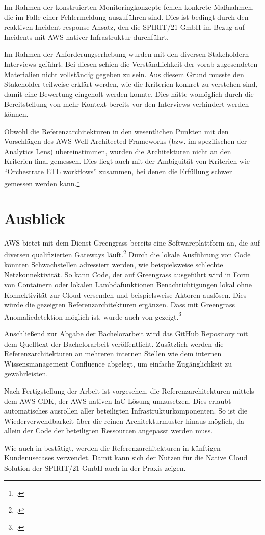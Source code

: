 Im Rahmen der konstruierten Monitoringkonzepte fehlen konkrete Maßnahmen, die im Falle einer Fehlermeldung auszuführen sind. Dies ist bedingt durch den reaktiven Incident-response Ansatz, den die SPIRIT/21 GmbH im Bezug auf Incidents mit \ac{AWS}-nativer Infrastruktur durchführt.

Im Rahmen der Anforderungserhebung wurden mit den diversen Stakeholdern Interviews geführt. Bei diesen schien die Verständlichkeit der vorab zugesendeten Materialien nicht vollständig gegeben zu sein. Aus diesem Grund musste den Stakeholder teilweise erklärt werden, wie die Kriterien konkret zu verstehen sind, damit eine Bewertung eingeholt werden konnte. Dies hätte womöglich durch die Bereitstellung von mehr Kontext bereits vor den Interviews verhindert werden können.

Obwohl die Referenzarchitekturen in den wesentlichen Punkten mit den Vorschlägen des \ac{AWS} Well-Architected Frameworks (bzw. im spezifischen der Analytics Lens) übereinstimmen, wurden die Architekturen nicht an den Kriterien final gemessen. Dies liegt auch mit der Ambiguität von Kriterien wie \enquote{Orchestrate ETL workflows} zusammen, bei denen die Erfüllung schwer gemessen werden kann.\footcite[Vgl.][6]{Ravirala.2020}


\section{Ausblick}
\ac{AWS} bietet mit dem Dienst Greengrass bereits eine Softwareplattform an, die auf diversen qualifizierten Gateways läuft.\footcite[Vgl. auch im Folgenden][]{AmazonWebServicesInc..o.J.bu} Durch die lokale Ausführung von Code könnten Schwachstellen adressiert werden, wie beispielsweise schlechte Netzkonnektivität. So kann Code, der auf Greengrass ausgeführt wird in Form von Containern oder lokalen Lambdafunktionen Benachrichtigungen lokal ohne Konnektivität zur Cloud versenden und beispielsweise Aktoren auslösen. Dies würde die gezeigten Referenzarchitekturen ergänzen. Dass mit Greengrass Anomaliedetektion möglich ist, wurde auch von \citeauthor{Shankar.2020} gezeigt.\footcite[Vgl.][]{Shankar.2020}

Anschließend zur Abgabe der Bachelorarbeit wird das GitHub Repository mit dem Quelltext der Bachelorarbeit veröffentlicht. Zusätzlich werden die Referenzarchitekturen an mehreren internen Stellen wie dem internen Wissensmanagement Confluence abgelegt, um einfache Zugänglichkeit zu gewährleisten.

Nach Fertigstellung der Arbeit ist vorgesehen, die Referenzarchitekturen mittels dem \ac{AWS} \ac{CDK}, der \ac{AWS}-nativen \ac{IaC} Lösung umzusetzen. Dies erlaubt automatisches ausrollen aller beteiligten Infrastrukturkomponenten. So ist die Wiederverwendbarkeit über die reinen Architekturmuster hinaus möglich, da allein der Code der beteiligten Ressourcen angepasst werden muss.

Wie auch in  bestätigt, werden die Referenzarchitekturen in künftigen Kundenusecases verwendet. Damit kann sich der Nutzen für die Native Cloud Solution der SPIRIT/21 GmbH auch in der Praxis zeigen.